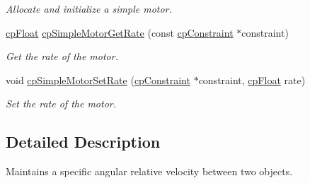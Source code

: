 \begin{DoxyCompactItemize}
\begin{DoxyCompactList}\small\item\em Allocate and initialize a simple motor. \end{DoxyCompactList}\item 
\hypertarget{group__cp_simple_motor_ga174d2ca2fda85aa5f82f972221ff6121}{}\hyperlink{group__basic_types_gac1ed65573e035bf892505768c852d8d3}{cp\+Float} \hyperlink{group__cp_simple_motor_ga174d2ca2fda85aa5f82f972221ff6121}{cp\+Simple\+Motor\+Get\+Rate} (const \hyperlink{structcp_constraint}{cp\+Constraint} $\ast$constraint)\label{group__cp_simple_motor_ga174d2ca2fda85aa5f82f972221ff6121}

\begin{DoxyCompactList}\small\item\em Get the rate of the motor. \end{DoxyCompactList}\item 
\hypertarget{group__cp_simple_motor_gaed1de73940fdf279fd2e52fc06dea716}{}void \hyperlink{group__cp_simple_motor_gaed1de73940fdf279fd2e52fc06dea716}{cp\+Simple\+Motor\+Set\+Rate} (\hyperlink{structcp_constraint}{cp\+Constraint} $\ast$constraint, \hyperlink{group__basic_types_gac1ed65573e035bf892505768c852d8d3}{cp\+Float} rate)\label{group__cp_simple_motor_gaed1de73940fdf279fd2e52fc06dea716}

\begin{DoxyCompactList}\small\item\em Set the rate of the motor. \end{DoxyCompactList}\end{DoxyCompactItemize}


\subsection{Detailed Description}
Maintains a specific angular relative velocity between two objects. 

